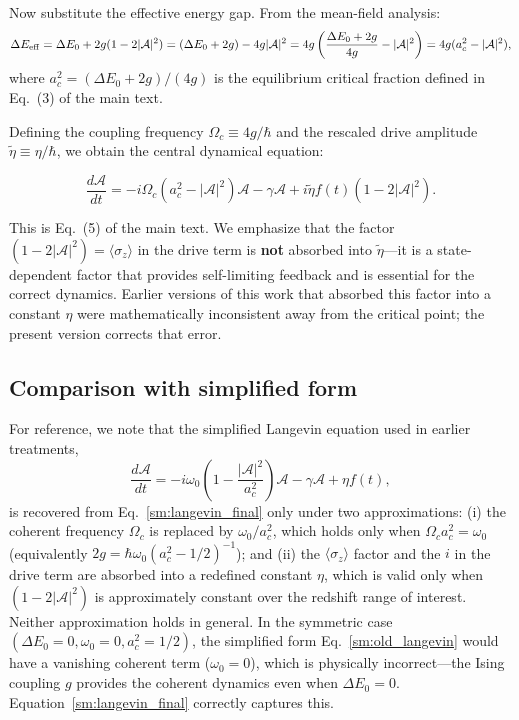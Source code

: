 \documentclass[aps,prd,onecolumn]{revtex4-2}
\begin{document}
Now substitute the effective energy gap. From the mean-field analysis:
\begin{equation}
\Delta E_{\rm eff} = \Delta E_0 + 2g(1-2|\mathcal{A}|^2) = (\Delta E_0 + 2g) - 4g|\mathcal{A}|^2 = 4g\left(\frac{\Delta E_0 + 2g}{4g} - |\mathcal{A}|^2\right) = 4g(a_c^2 - |\mathcal{A}|^2),
\label{sm:deltaE_expanded}
\end{equation}
where $a_c^2 = (\Delta E_0 + 2g)/(4g)$ is the equilibrium critical fraction defined in Eq.~(3) of the main text.

Defining the coupling frequency $\Omega_c \equiv 4g/\hbar$ and the rescaled drive amplitude $\tilde{\eta} \equiv \eta/\hbar$, we obtain the central dynamical equation:

\begin{equation}
\boxed{\frac{d\mathcal{A}}{dt} = -i\Omega_c(a_c^2 - |\mathcal{A}|^2)\mathcal{A} - \gamma\mathcal{A} + i\tilde{\eta}f(t)(1-2|\mathcal{A}|^2)}.
\label{sm:langevin_final}
\end{equation}

This is Eq.~(5) of the main text. We emphasize that the factor $(1-2|\mathcal{A}|^2) = \langle\sigma_z\rangle$ in the drive term is \textbf{not} absorbed into $\tilde{\eta}$---it is a state-dependent factor that provides self-limiting feedback and is essential for the correct dynamics. Earlier versions of this work that absorbed this factor into a constant $\eta$ were mathematically inconsistent away from the critical point; the present version corrects that error.

\subsection{Comparison with simplified form}

For reference, we note that the simplified Langevin equation used in earlier treatments,
\begin{equation}
\frac{d\mathcal{A}}{dt} = -i\omega_0\left(1 - \frac{|\mathcal{A}|^2}{a_c^2}\right)\mathcal{A} - \gamma\mathcal{A} + \eta f(t),
\label{sm:old_langevin}
\end{equation}
is recovered from Eq.~\eqref{sm:langevin_final} only under two approximations: (i) the coherent frequency $\Omega_c$ is replaced by $\omega_0/a_c^2$, which holds only when $\Omega_c a_c^2 = \omega_0$ (equivalently $2g = \hbar\omega_0(a_c^2 - 1/2)^{-1}$); and (ii) the $\langle\sigma_z\rangle$ factor and the $i$ in the drive term are absorbed into a redefined constant $\eta$, which is valid only when $(1-2|\mathcal{A}|^2)$ is approximately constant over the redshift range of interest. Neither approximation holds in general. In the symmetric case $(\Delta E_0 = 0, \omega_0 = 0, a_c^2 = 1/2)$, the simplified form Eq.~\eqref{sm:old_langevin} would have a vanishing coherent term ($\omega_0 = 0$), which is physically incorrect---the Ising coupling $g$ provides the coherent dynamics even when $\Delta E_0 = 0$. Equation~\eqref{sm:langevin_final} correctly captures this.
\end{document}
